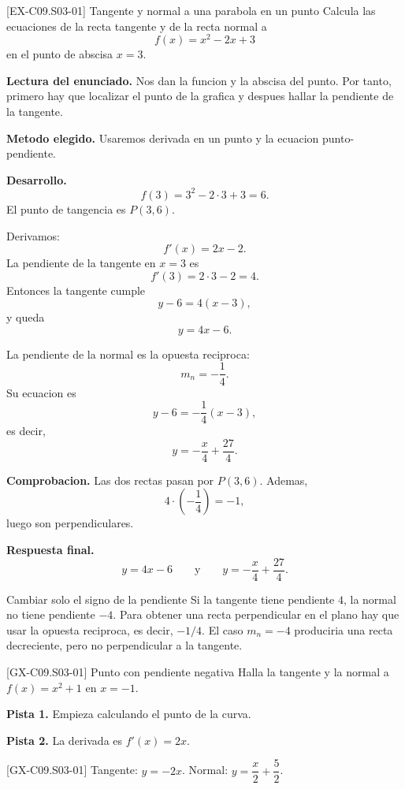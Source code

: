 \begin{solvedexample}{[EX-C09.S03-01] Tangente y normal a una parabola en un punto}
Calcula las ecuaciones de la recta tangente y de la recta normal a
\[
f(x)=x^2-2x+3
\]
en el punto de abscisa \(x=3\).

\textbf{Lectura del enunciado.} Nos dan la funcion y la abscisa del punto. Por tanto, primero
hay que localizar el punto de la grafica y despues hallar la pendiente de la tangente.

\textbf{Metodo elegido.} Usaremos derivada en un punto y la ecuacion punto-pendiente.

\textbf{Desarrollo.}
\[
f(3)=3^2-2\cdot 3+3=6.
\]
El punto de tangencia es \(P(3,6)\).

Derivamos:
\[
f'(x)=2x-2.
\]
La pendiente de la tangente en \(x=3\) es
\[
f'(3)=2\cdot 3-2=4.
\]
Entonces la tangente cumple
\[
y-6=4(x-3),
\]
y queda
\[
y=4x-6.
\]

La pendiente de la normal es la opuesta reciproca:
\[
m_n=-\frac{1}{4}.
\]
Su ecuacion es
\[
y-6=-\frac{1}{4}(x-3),
\]
es decir,
\[
y=-\frac{x}{4}+\frac{27}{4}.
\]

\textbf{Comprobacion.} Las dos rectas pasan por \(P(3,6)\). Ademas,
\[
4\cdot\left(-\frac{1}{4}\right)=-1,
\]
luego son perpendiculares.

\textbf{Respuesta final.}
\[
\boxed{y=4x-6}
\qquad\text{y}\qquad
\boxed{y=-\frac{x}{4}+\frac{27}{4}}.
\]
\end{solvedexample}

\begin{commonerror}{Cambiar solo el signo de la pendiente}
Si la tangente tiene pendiente \(4\), la normal no tiene pendiente \(-4\). Para obtener una
recta perpendicular en el plano hay que usar la opuesta reciproca, es decir, \(-1/4\). El
caso \(m_n=-4\) produciria una recta decreciente, pero no perpendicular a la tangente.
\end{commonerror}

\begin{guidedexercise}{[GX-C09.S03-01] Punto con pendiente negativa}
Halla la tangente y la normal a \(f(x)=x^2+1\) en \(x=-1\).

\textbf{Pista 1.} Empieza calculando el punto de la curva.

\textbf{Pista 2.} La derivada es \(f'(x)=2x\).
\end{guidedexercise}

\begin{shortanswer}{[GX-C09.S03-01]}
Tangente: \(y=-2x\). Normal: \(y=\dfrac{x}{2}+\dfrac{5}{2}\).
\end{shortanswer}

